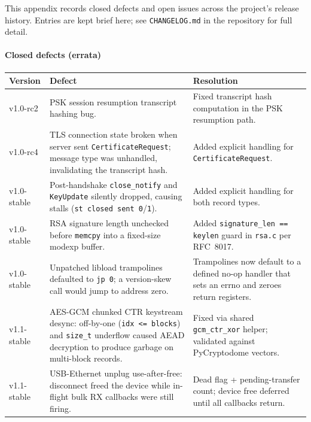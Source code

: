 \documentclass[titlepage]{report}
\renewcommand{\arraystretch}{1.5}
\begin{document}
	This appendix records closed defects and open issues across the project's release history. Entries are kept brief here; see \texttt{CHANGELOG.md} in the repository for full detail.

	\paragraph{Closed defects (errata)}

	\renewcommand{\arraystretch}{1.3}
	\begin{longtable}{@{}>{\raggedright\arraybackslash}p{}>{\raggedright\arraybackslash}p{}>{\raggedright\arraybackslash}p{}@{}}
		\toprule
		\textbf{Version} & \textbf{Defect} & \textbf{Resolution} \\
		\midrule
		\endhead
		v1.0-rc2
		& PSK session resumption transcript hashing bug.
		& Fixed transcript hash computation in the PSK resumption path. \\
		\addlinespace
		v1.0-rc4
		& TLS connection state broken when server sent \texttt{CertificateRequest}; message type was unhandled, invalidating the transcript hash.
		& Added explicit handling for \texttt{CertificateRequest}. \\
		\addlinespace
		v1.0-stable
		& Post-handshake \texttt{close\_notify} and \texttt{KeyUpdate} silently dropped, causing stalls (\texttt{st closed sent 0}/\texttt{1}).
		& Added explicit handling for both record types. \\
		\addlinespace
		v1.0-stable
		& RSA signature length unchecked before \texttt{memcpy} into a fixed-size modexp buffer.
		& Added \texttt{signature\_len == keylen} guard in \texttt{rsa.c} per RFC~8017. \\
		\addlinespace
		v1.0-stable
		& Unpatched libload trampolines defaulted to \texttt{jp~0}; a version-skew call would jump to address zero.
		& Trampolines now default to a defined no-op handler that sets an errno and zeroes return registers. \\
		\addlinespace
		v1.1-stable
		& AES-GCM chunked CTR keystream desync: off-by-one (\texttt{idx <= blocks}) and \texttt{size\_t} underflow caused AEAD decryption to produce garbage on multi-block records.
		& Fixed via shared \texttt{gcm\_ctr\_xor} helper; validated against PyCryptodome vectors. \\
		\addlinespace
		v1.1-stable
		& USB-Ethernet unplug use-after-free: disconnect freed the device while in-flight bulk RX callbacks were still firing.
		& Dead flag + pending-transfer count; device free deferred until all callbacks return. \\

\end{longtable}
\end{document}
